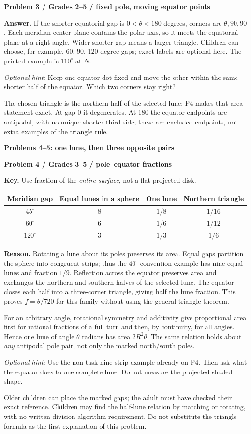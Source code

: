 \documentclass[11pt,letterpaper]{article}
\newcommand{\topic}[1]{\par{\large\bfseries\color{blue}#1}\par}
\newcommand{\sub}[1]{\par\textbf{#1}\par}
\newcommand{\hint}[1]{\textit{Optional hint:} #1\par}
\newcommand{\degc}{^\circ}
\begin{document}
\sub{Problem 3 / Grades 2--5 / fixed pole, moving equator points}
\textbf{Answer.} If the shorter equatorial gap is $0<\theta<180$ degrees, corners are $\theta,90,90$. Each meridian center plane contains the polar axis, so it meets the equatorial plane at a right angle. Wider shorter gap means a larger triangle. Children can choose, for example, $60$, $90$, $120$ degree gaps; exact labels are optional here. The printed example is $110\degc$ at $N$.

\hint{Keep one equator dot fixed and move the other within the same shorter half of the equator. Which two corners stay right?}
The chosen triangle is the northern half of the selected lune; P4 makes that area statement exact. At gap 0 it degenerates. At 180 the equator endpoints are antipodal, with no unique shorter third side; these are excluded endpoints, not extra examples of the triangle rule.

\newpage
\topic{Problems 4--5: one lune, then three opposite pairs}
\sub{Problem 4 / Grades 3--5 / pole--equator fractions}
\textbf{Key.} Use fraction of the \emph{entire surface}, not a flat projected disk.
\begin{center}\begin{tabular}{c|c|c|c}
Meridian gap & Equal lunes in a sphere & One lune & Northern triangle\\\hline
$45\degc$ & 8 & $1/8$ & $1/16$\\
$60\degc$ & 6 & $1/6$ & $1/12$\\
$120\degc$ & 3 & $1/3$ & $1/6$
\end{tabular}\end{center}
\textbf{Reason.} Rotating a lune about its poles preserves its area. Equal gaps partition the sphere into congruent strips; thus the $40\degc$ convention example has nine equal lunes and fraction $1/9$. Reflection across the equator preserves area and exchanges the northern and southern halves of the selected lune. The equator closes each half into a three-corner triangle, giving half the lune fraction. This proves $f=\theta/720$ for this family without using the general triangle theorem.

For an arbitrary angle, rotational symmetry and additivity give proportional area first for rational fractions of a full turn and then, by continuity, for all angles. Hence one lune of angle $\theta$ radians has area $2R^2\theta$. The same relation holds about \emph{any} antipodal pole pair, not only the marked north/south poles.

\hint{Use the non-task nine-strip example already on P4. Then ask what the equator does to one complete lune. Do not measure the projected shaded shape.}
Older children can place the marked gaps; the adult must have checked their exact reference. Children may find the half-lune relation by matching or rotating, with no written division algorithm requirement. Do not substitute the triangle formula as the first explanation of this problem.
\end{document}
